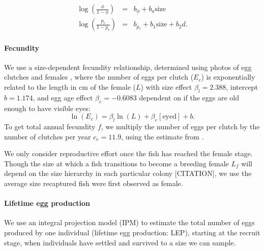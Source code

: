 \documentclass[12pt, oneside]{article}   	%
\begin{document}
\begin{eqnarray}
\log(\frac{\phi}{1-\phi}) &=& b_\phi + b_a\text{size} \\
\log(\frac{p_r}{1-p_r}) &=& b_{p_r} + b_1\text{size} + b_2d. \label{EQN_Survival}
\end{eqnarray}

\paragraph*{Fecundity}

We use a size-dependent fecundity relationship, determined using photos of egg clutches and females \citep{yawdoszynInPrepfecundity}, where the number of eggs per clutch ($E_c$) is exponentially related to the length in cm of the female ($L$) with size effect $\beta_l = 2.388$, intercept $b = 1.174$, and egg age effect $\beta_e = -0.6083$ dependent on if the eggs are old enough to have visible eyes: 
\begin{equation} %
\ln(E_c) = \beta_l\ln(L) + \beta_e[\text{eyed}] + b. \label{EQN_Fec}
\end{equation}
To get total annual fecundity $f$, we multiply the number of eggs per clutch by the number of clutches per year $c_e = 11.9$, using the estimate from \cite{holtswarth2017fecundity}.

We only consider reproductive effort once the fish has reached the female stage. Though the size at which a fish transitions to become a breeding female $L_f$ will depend on the size hierarchy in each particular colony [CITATION], we use the average size recaptured fish were first observed as female. 


\paragraph*{Lifetime egg production}
We use an integral projection model (IPM) \citep[e.g.][]{rees2014building} to estimate the total number of eggs produced by one individual (lifetime egg production: LEP), starting at the recruit stage, when individuals have settled and survived to a size we can sample.
\end{document}
